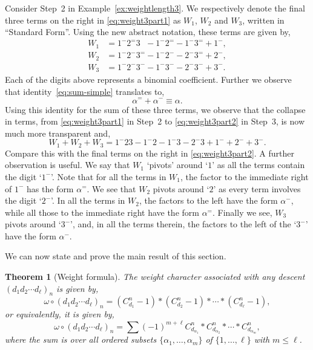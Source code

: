 \documentclass[5p,twocolumn]{elsarticle}
\newtheorem{theorem}{Theorem}
\begin{document}
%
\begin{example}
 Consider Step~2 in Example~\ref{ex:weightlength3}. We respectively denote the final three terms on the right in \eqref{eq:weight3part1} as $W_1$, $W_2$ and $W_3$,
 written in ``Standard Form''. Using the new abstract notation, these terms are given by,
 \begin{align*}
   W_1&=1^-2^=3\phantom{^-}-1^-2^=-1^-3^=+1^-,\\
   W_2&=1^-2^-3^=-1^-2^--2^-3^=+2^-,\\
   W_3&=1^-2^-3^--1^-3^--2^-3^-+3^-.
 \end{align*}
 Each of the digits above represents a binomial coefficient. Further we observe that identity~\eqref{eq:sum-simple} translates to,
 \begin{equation}\label{eq:sum-simpleabstract}
   \alpha^=+\alpha^-\equiv\alpha.
 \end{equation}
 Using this identity for the sum of these three terms, we observe that the collapse in terms, from \eqref{eq:weight3part1} in Step~2 to \eqref{eq:weight3part2} in Step~3,
 is now much more transparent and,
 \begin{equation*}
 W_1+W_2+W_3=1^-23-1^-2-1^-3-2^-3+1^-\!+2^-\!+3^-.
 \end{equation*}
 Compare this with the final terms on the right in \eqref{eq:weight3part2}. 
 A further observation is useful. We say that $W_1$ `pivots' around `$1$' as all the terms contain the digit `$1^-$'.
 Note that for all the terms in $W_1$, the factor to the immediate right of $1^-$ has the form $\alpha^=$.
 We see that $W_2$ pivots around `$2$' as every term involves the digit `$2^-$'.
 In all the terms in $W_2$, the factors to the left have the form $\alpha^-$, while all those to the immediate right have the form $\alpha^=$.
 Finally we see, $W_3$ pivots around `$3^-$', and, in all the terms therein, the factors to the left of the `$3^-$' have the form $\alpha^-$.
\end{example}
%
We can now state and prove the main result of this section. 
%
\begin{theorem}[Weight formula]\label{thm:weightformula}
  The weight character associated with any descent $(d_1d_2\cdots d_\ell)_n$ is given by,
  \begin{equation*}
    \omega\circ (d_1d_2\cdots d_\ell)_n=(C^n_{d_1}-1)\ast(C^n_{d_2}-1)\ast\cdots\ast(C^n_{d_\ell}-1),
  \end{equation*}
  or equivalently, it is given by,
  \begin{equation*}  
    \omega\circ (d_1d_2\cdots d_\ell)_n=\sum (-1)^{m+\ell}C_{d_{\alpha_1}}^n\ast C_{d_{\alpha_2}}^n\ast\cdots\ast C_{d_{\alpha_m}}^n,
  \end{equation*}
  where the sum is over all ordered subsets $\{\alpha_1,\ldots,\alpha_m\}$ of $\{1,\ldots,\ell\}$ with $m\leqslant\ell$.
\end{theorem}
\end{document}

